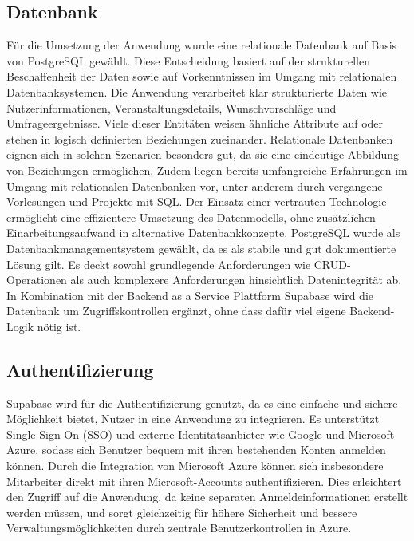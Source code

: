\documentclass[a4paper,12pt]{article}
\begin{document}
\newpage


\subsection{Datenbank}
Für die Umsetzung der Anwendung wurde eine relationale Datenbank auf Basis von PostgreSQL gewählt. Diese Entscheidung basiert auf der strukturellen Beschaffenheit der Daten sowie auf Vorkenntnissen im Umgang mit relationalen Datenbanksystemen. Die Anwendung verarbeitet klar strukturierte Daten wie Nutzerinformationen, Veranstaltungsdetails, Wunschvorschläge und Umfrageergebnisse. Viele dieser Entitäten weisen ähnliche Attribute auf oder stehen in logisch definierten Beziehungen zueinander. Relationale Datenbanken eignen sich in solchen Szenarien besonders gut, da sie eine eindeutige Abbildung von Beziehungen ermöglichen. Zudem liegen bereits umfangreiche Erfahrungen im Umgang mit relationalen Datenbanken vor, unter anderem durch vergangene Vorlesungen und Projekte mit SQL. Der Einsatz einer vertrauten Technologie ermöglicht eine effizientere Umsetzung des Datenmodells, ohne zusätzlichen Einarbeitungsaufwand in alternative Datenbankkonzepte. PostgreSQL wurde als Datenbankmanagementsystem gewählt, da es als stabile und gut dokumentierte Lösung gilt. Es deckt sowohl grundlegende Anforderungen wie CRUD-Operationen als auch komplexere Anforderungen hinsichtlich Datenintegrität ab. In Kombination mit der Backend as a Service Plattform \gls{Supabase} wird die Datenbank um Zugriffskontrollen ergänzt, ohne dass dafür viel eigene Backend-Logik nötig ist.


\subsection{Authentifizierung}
Supabase wird für die Authentifizierung genutzt, da es eine einfache und sichere Möglichkeit bietet, Nutzer in eine Anwendung zu integrieren. Es unterstützt Single Sign-On (SSO) und externe Identitätsanbieter wie Google und Microsoft Azure, sodass sich Benutzer bequem mit ihren bestehenden Konten anmelden können. Durch die Integration von Microsoft Azure können sich insbesondere Mitarbeiter direkt mit ihren Microsoft-Accounts authentifizieren. Dies erleichtert den Zugriff auf die Anwendung, da keine separaten Anmeldeinformationen erstellt werden müssen, und sorgt gleichzeitig für höhere Sicherheit und bessere Verwaltungsmöglichkeiten durch zentrale Benutzerkontrollen in Azure.
\end{document}

